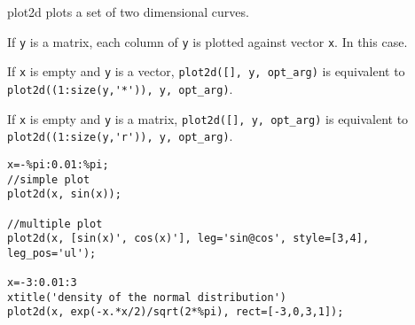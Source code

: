 \begin{mandescription}
  plot2d plots a set of two dimensional curves.

  If \verb+y+ is a matrix, each column of \verb+y+ is plotted against vector
  \verb+x+. In this case.

  If \verb+x+ is empty and \verb+y+ is a vector, \verb+plot2d([], y, opt_arg)+ is
  equivalent to \verb|plot2d((1:size(y,'*')), y, opt_arg)|.

  If \verb+x+ is empty and \verb+y+ is a matrix, \verb+plot2d([], y, opt_arg)+ is
  equivalent to \verb|plot2d((1:size(y,'r')), y, opt_arg)|.  
\end{mandescription}

\begin{examples}
\begin{Verbatim}
x=-%pi:0.01:%pi;
//simple plot
plot2d(x, sin(x));

//multiple plot
plot2d(x, [sin(x)', cos(x)'], leg='sin@cos', style=[3,4], leg_pos='ul');

x=-3:0.01:3
xtitle('density of the normal distribution')
plot2d(x, exp(-x.*x/2)/sqrt(2*%pi), rect=[-3,0,3,1]);
\end{Verbatim}
\end{examples}

\begin{manseealso}
\end{manseealso}

